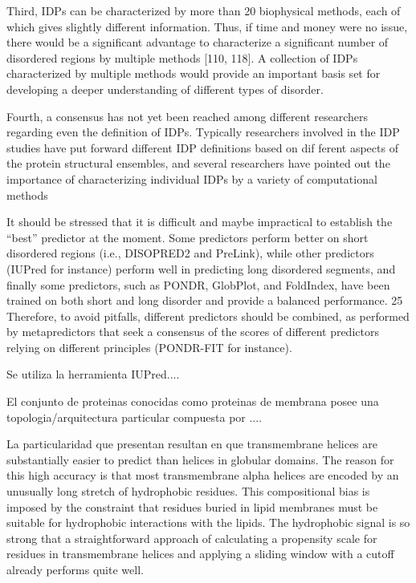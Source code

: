 Third, IDPs can be characterized by more than 20 biophysical methods, each of which gives slightly different information. Thus, if time and money were no issue,
there would be a significant advantage to characterize a significant number of disordered regions by multiple
methods [110, 118]. A collection of IDPs characterized by multiple methods would provide an important basis
set for developing a deeper understanding of different types of disorder.

Fourth, a consensus has not yet been reached among different researchers regarding even the definition of IDPs. Typically researchers involved in the IDP studies
have put forward different IDP definitions based on dif ferent aspects of the protein structural ensembles, and
several researchers have pointed out the importance of characterizing individual IDPs by a variety of computational methods


It should
be stressed that it is difficult and maybe impractical to establish
the “best” predictor at the moment. Some predictors perform
better on short disordered regions (i.e., DISOPRED2 and
PreLink), while other predictors (IUPred for instance) perform
well in predicting long disordered segments, and finally some
predictors, such as PONDR, GlobPlot, and FoldIndex, have been
trained on both short and long disorder and provide a balanced
performance. 25 Therefore, to avoid pitfalls, different predictors
should be combined, as performed by metapredictors that seek a
consensus of the scores of different predictors relying on different
principles (PONDR-FIT for instance).



Se utiliza la herramienta IUPred....



El conjunto de proteinas conocidas como proteinas de membrana posee una topologia/arquitectura particular compuesta por ....

La particularidad que presentan resultan en que transmembrane helices are substantially easier to predict than helices in globular domains.
The reason for this high accuracy is that most transmembrane alpha helices are encoded by an unusually long stretch of
hydrophobic residues. This compositional bias is imposed by the constraint that residues buried in lipid membranes
must be suitable for hydrophobic interactions with the lipids.
The hydrophobic signal is so strong that a straightforward approach of calculating a propensity scale for residues in
transmembrane helices and applying a sliding window with a cutoff already performs quite well.


